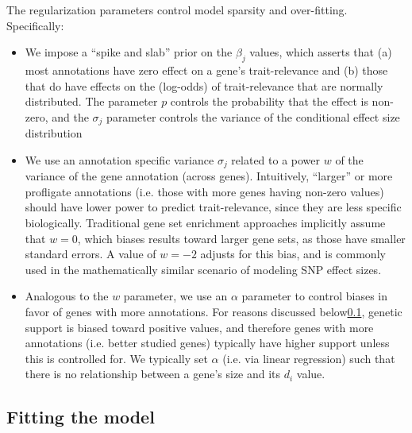 The regularization parameters control model sparsity and
over-fitting. Specifically:
\begin{itemize}
  \item We impose a ``spike and slab'' prior on the $\beta_j$ values,
    which asserts that (a) most annotations have zero effect on a
    gene's trait-relevance and (b) those that do have effects on the
    (log-odds) of trait-relevance that are normally distributed. The
    parameter $p$ controls the probability that the effect is
    non-zero, and the $\sigma_j$ parameter controls the variance of
    the conditional effect size distribution
  \item We use an annotation specific variance $\sigma_j$ related to
    a power $w$ of the variance of the gene annotation (across
    genes). Intuitively, ``larger'' or more profligate annotations
    (i.e. those with more genes having non-zero values)
    should have lower power to predict trait-relevance, since they are
    less specific biologically. Traditional gene set enrichment approaches
    implicitly assume that $w=0$, which biases results toward larger gene sets,
    as those have smaller standard errors. A value of $w=-2$ adjusts
    for this bias, and is commonly used in the mathematically similar
    scenario of modeling SNP effect sizes\cite{}.
    \item Analogous to the $w$ parameter, we use an $\alpha$ parameter
      to control biases in favor of genes with more annotations. For
      reasons discussed below\ref{}, genetic support is biased toward
      positive values, and therefore genes with more annotations
      (i.e. better studied genes) typically have higher support unless
      this is controlled for. We typically set $\alpha$ (i.e. via
      linear regression)
      such that there is no relationship between a gene's size and its
      $d_i$ value.
\end{itemize}

\subsection{Fitting the model}

